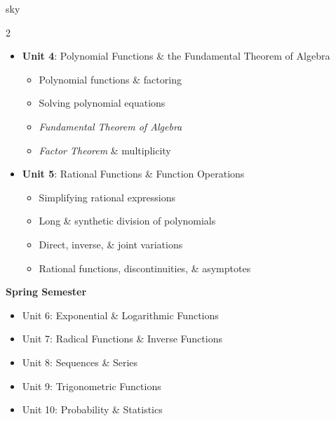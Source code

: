 \documentclass[10pt]{article}
\begin{document}
\begin{skillbox}{sky}
\begin{multicols}{2}
\begin{itemize}
                \item \textbf{Unit 4}:  Polynomial Functions \& the Fundamental Theorem of Algebra
                \begin{itemize}
                    \item Polynomial functions \& factoring
                    \item Solving polynomial equations
                    \item \textit{Fundamental Theorem of Algebra}
                    \item \textit{Factor Theorem} \& multiplicity
                \end{itemize}
                \item \textbf{Unit 5}:  Rational Functions \& Function Operations
                \begin{itemize}
                    \item Simplifying rational expressions
                    \item Long \& synthetic division of polynomials
                    \item Direct, inverse, \& joint variations
                    \item Rational functions, discontinuities, \& asymptotes
                \end{itemize}
            \end{itemize}
            \columnbreak
            \textbf{Spring Semester}
            \begin{itemize}
                \item Unit 6:  Exponential \& Logarithmic Functions
                \item Unit 7:  Radical Functions \& Inverse Functions
                \item Unit 8:  Sequences \& Series
                \item Unit 9:  Trigonometric Functions
                \item Unit 10:  Probability \& Statistics
            \end{itemize}
        \end{multicols}
    \end{skillbox}
\end{document}
